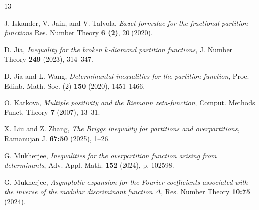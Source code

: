 \documentclass[11pt,reqno,a4paper]{amsart}
\renewcommand{\(}{\left\(}
\renewcommand{\)}{\right\)}
\numberwithin{equation}{section}
\theoremstyle{plain}
\theoremstyle{definition} %
\numberwithin{equation}{section}
\begin{document}
\begin{thebibliography}{13}

		

		 J. Iskander, V. Jain, and V. Talvola, {\it Exact formulae for the fractional partition functions} Res. Number Theory {\bf 6 (2)}, 20 (2020).
		
		 D. Jia, {\it Inequality for the broken $k$-diamond partition functions}, J. Number Theory {\bf 249} (2023), 314--347.
		
		 D. Jia and L. Wang, {\it Determinantal inequalities for the partition
			function}, Proc. Edinb. Math. Soc. (2) {\bf 150} (2020), 1451--1466.
		
		 O. Katkova, {\it Multiple positivity and the Riemann zeta-function}, Comput. Methods Funct. Theory {\bf 7} (2007), 13--31.


		 X. Liu and Z. Zhang, {\it The Briggs inequality for partitions and overpartitions}, Ramanujan J. {\bf 67:50} (2025), 1--26. %
		

		
		 G. Mukherjee, {\it Inequalities for the overpartition function arising from determinants}, Adv. Appl. Math. {\bf 152} (2024), p. 102598.

		 G. Mukherjee, {\it Asymptotic expansion for the Fourier coefficients associated with the inverse of the modular discriminant function $\Delta$}, Res. Number Theory {\bf 10:75} (2024).
		

\end{thebibliography}
\end{document}

